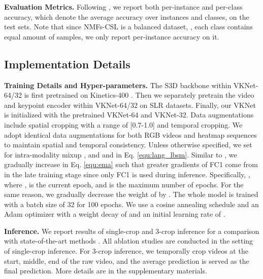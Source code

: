 \documentclass[10pt,twocolumn,letterpaper]{article}
\def \tbf{\textbf}
\begin{document}
\noindent\tbf{Evaluation Metrics.}
Following \cite{hu2021signbert, hu2021hand, jiang2021sign}, we report both per-instance and per-class accuracy, which denote the average accuracy over instances and classes, on the test sets. Note that since NMFs-CSL is a balanced dataset, \ie, each class contains equal amount of samples, we only report per-instance accuracy on it.


\subsection{Implementation Details}
\noindent\tbf{Training Details and Hyper-parameters.}
The S3D backbone within VKNet-64/32 is first pretrained on Kinetics-400 \cite{kay2017kinetics}.
Then we separately pretrain the video and keypoint encoder within VKNet-64/32 on SLR datasets.
Finally, our VKNet is initialized with the pretrained VKNet-64 and VKNet-32.
Data augmentations include spatial cropping with a range of [0.7-1.0] and temporal cropping.
We adopt identical data augmentations for both RGB videos and heatmap sequences to maintain spatial and temporal consistency.
Unless otherwise specified, we set  for intra-modality mixup \cite{zhang2018mixup}, and  and  in Eq. \ref{equ:lang_lbsm}.
Similar to \cite{grill2020bootstrap}, we gradually increase  in Eq. \ref{equ:ema} such that greater gradients of FC1 come from  in the late training stage since only FC1 is used during inference.
Specifically, , where ,  is the current epoch, and  is the maximum number of epochs.
For the same reason, we gradually decrease the weight of  by .
The whole model is trained with a batch size of 32 for 100 epochs.
We use a cosine annealing schedule and an Adam optimizer \cite{adam} with a weight decay of  and an initial learning rate of .


\noindent\tbf{Inference.}
We report results of single-crop and 3-crop inference for a comparison with state-of-the-art methods \cite{albanie2020bsl, jiang2021skeleton, jiang2021sign}. All ablation studies are conducted in the setting of single-crop inference. For 3-crop inference, we temporally crop videos at the start, middle, end of the raw video, and the average prediction is served as the final prediction.
More details are in the supplementary materials.
\end{document}
